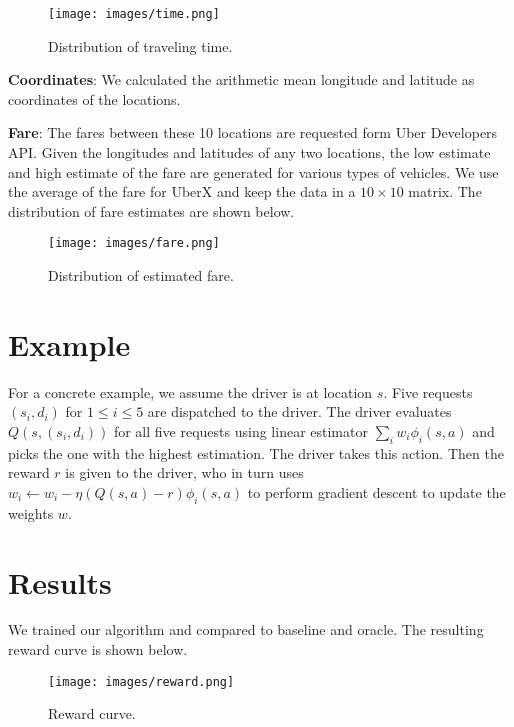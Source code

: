 \documentclass{article}
\begin{document}
\begin{figure}[H]
\begin{center}
\texttt{[image: images/time.png]}
\end{center}
\caption{Distribution of traveling time.}
\end{figure}

\noindent\textbf{Coordinates}: We calculated the arithmetic mean longitude and latitude as coordinates of the locations.

\noindent\textbf{Fare}: The fares between these 10 locations are requested form Uber Developers API. Given the longitudes and latitudes of any two locations, the low estimate and high estimate of the fare are generated for various types of vehicles. We use the average of the fare for UberX and keep the data in a $10\times 10$ matrix. The distribution of fare estimates are shown below.

\begin{figure}[H]
\begin{center}
\texttt{[image: images/fare.png]}
\end{center}
\caption{Distribution of estimated fare.}
\end{figure}

\section{Example}

For a concrete example, we assume the driver is at location $s$. Five requests $(s_{i},d_{i})$ for $1\leq i\leq 5$ are dispatched to the driver. The driver evaluates $Q(s,(s_{i},d_{i}))$ for all five requests using linear estimator $\sum_{i}w_{i}\phi_{i}(s,a)$ and picks the one with the highest estimation. The driver takes this action. Then the reward $r$ is given to the driver, who in turn uses $w_{i}\leftarrow w_{i}-\eta(Q(s,a)-r)\phi_{i}(s,a)$ to perform gradient descent to update the weights $w$.

\section{Results}

We trained our algorithm and compared to baseline and oracle. The resulting reward curve is shown below.

\begin{figure}[H]
\begin{center}
\texttt{[image: images/reward.png]}
\end{center}
\caption{Reward curve.}
\end{figure}
\end{document}
